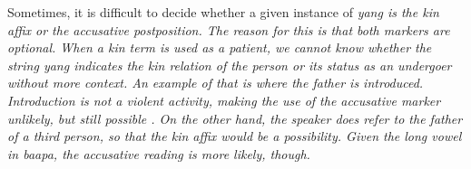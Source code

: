 
% 
% 


Sometimes, it is difficult to decide whether a given instance of \em yang \em is the kin affix or the accusative postposition.  The reason for this is that both markers are optional. When a kin term is used as a patient, we cannot know whether the string \em yang \em indicates the kin relation of the person or its status as an undergoer without more context. An example of that is  where the father is introduced. Introduction is not a violent activity, making the use of the accusative marker unlikely, but still possible . On the other hand, the speaker does refer to the father of a third person, so that the kin affix would be a possibility. Given the long vowel in \em baapa\em, the accusative reading is more likely, though.

 \\

